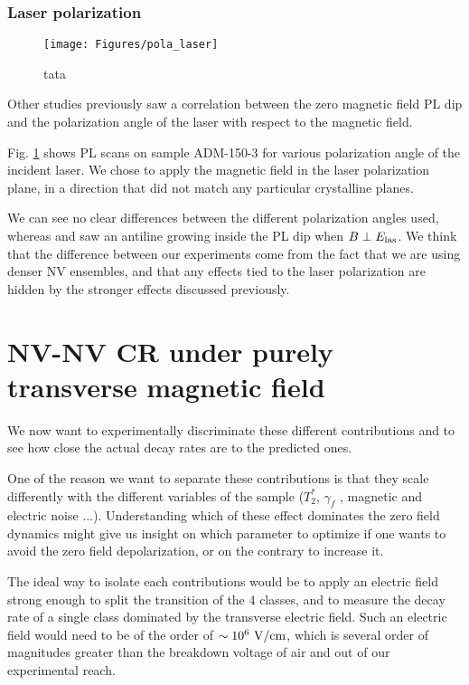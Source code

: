 \documentclass[a4paper,11pt]{report}
\begin{document}
\subsubsection{Laser polarization}
\begin{figure}[h]
\centering
\texttt{[image: Figures/pola\_laser]}
\caption{tata}
\label{pola laser}
\end{figure}

Other studies \citep{anishchik2015low, filimonenko2020weak} previously saw a correlation between the zero magnetic field PL dip and the polarization angle of the laser with respect to the magnetic field. 

Fig. \ref{pola laser} shows PL scans on sample ADM-150-3 for various polarization angle of the incident laser. We chose to apply the magnetic field in the laser polarization plane, in a direction that did not match any particular crystalline planes.

We can see no clear differences between the different polarization angles used, whereas \citep{anishchik2015low} and \citep{filimonenko2020weak} saw an antiline growing inside the PL dip when $B \perp E_{\rm las}$. We think that the difference between our experiments come from the fact that we are using denser NV ensembles, and that any effects tied to the laser polarization are hidden by the stronger effects discussed previously.


\section{NV-NV CR under purely transverse magnetic field}
We now want to experimentally discriminate these different contributions and to see how close the actual decay rates are to the predicted ones. 

One of the reason we want to separate these contributions is that they scale differently with the different variables of the sample ($T_2^*$, $\gamma_f$ , magnetic and electric noise ...). Understanding which of these effect dominates the zero field dynamics might give us insight on which parameter to optimize if one wants to avoid the zero field depolarization, or on the contrary to increase it.

The ideal way to isolate each contributions would be to apply an electric field strong enough to split the transition of the 4 classes, and to measure the decay rate of a single class dominated by the transverse electric field. Such an electric field would need to be of the order of $\sim 10^6\ \rm{V/cm}$, which is several order of magnitudes greater than the breakdown voltage of air and out of our experimental reach.
\end{document}
